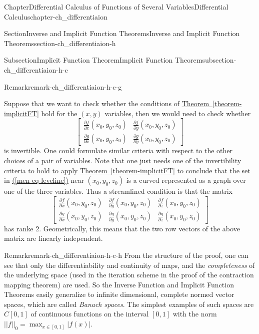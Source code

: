 \documentclass[oneside,10pt,]{book}
\newcommand{\xreffont}{\relax}
\numberwithin{equation}{section}
\newcommand{\amp}{&}
\begin{document}
\begin{chapterptx}{Chapter}{Differential Calculus of Functions of Several Variables}{}{Differential Calculus}{}{}{chapter-ch_differentiaion}
\begin{sectionptx}{Section}{Inverse and Implicit Function Theorems}{}{Inverse and Implicit Function Theorems}{}{}{section-ch_differentiaion-h}
\begin{subsectionptx}{Subsection}{Implicit Function Theorem}{}{Implicit Function Theorem}{}{}{subsection-ch_differentiaion-h-c}
\begin{remark}{Remark}{}{remark-ch_differentiaion-h-c-g}
\par
Suppose that we want to check whether the conditions of \hyperref[theorem-implicitFT]{Theorem~{\xreffont\ref{theorem-implicitFT}}} hold for the \((x, y)\) variables, then we would need to check whether%
\begin{equation*}
\begin{bmatrix} \frac{\partial f}{\partial x}(x_{0}, y_{0},z_{0}) \amp \frac{\partial f}{\partial y}(x_{0}, y_{0},z_{0})\\
\frac{\partial g}{\partial x}(x_{0}, y_{0},z_{0}) \amp \frac{\partial g}{\partial y}(x_{0}, y_{0},z_{0})\end{bmatrix}
\end{equation*}
is invertible.  One could formulate similar criteria with respect to the other choices of a pair of variables. Note that one just needs one of the invertibility criteria to hold to apply \hyperref[theorem-implicitFT]{Theorem~{\xreffont\ref{theorem-implicitFT}}} to conclude that the set in \hyperref[men-eq-leveline]{({\xreffont\ref{men-eq-leveline}})} near \((x_{0}, y_{0},z_{0})\) is a curved  represented as a graph over one of the  three variables. Thus a streamlined condition is that the matrix%
\begin{equation*}
\begin{bmatrix} \frac{\partial f}{\partial x}(x_{0}, y_{0},z_{0}) \amp \frac{\partial f}{\partial y}(x_{0}, y_{0},z_{0})
\amp \frac{\partial f}{\partial z}(x_{0}, y_{0},z_{0}) \\
\frac{\partial g}{\partial x}(x_{0}, y_{0},z_{0}) \amp \frac{\partial g}{\partial y}(x_{0}, y_{0},z_{0})
\amp \frac{\partial g}{\partial z}(x_{0}, y_{0},z_{0}) \end{bmatrix}
\end{equation*}
has ranke \(2\). Geometrically, this means that the two row vectors of the above matrix are linearly independent.%
\end{remark}
\begin{remark}{Remark}{}{remark-ch_differentiaion-h-c-h}%
From the structure of the proof, one can see that only the differentiability and continuity of maps, and the \emph{completeness} of the underlying space (used in the iteration scheme in the proof of the contraction mapping theorem) are used. So the Inverse Function and Implicit Function Theorems easily generalize to  infinite dimensional, complete normed vector spaces, which are called \emph{Banach spaces}. The simplest examples of such spaces are \(C[0,1]\) of continuous functions on the interval \([0,1]\) with the norm \(||f||_0 = \max_{x \in [0,1]} |f(x)|\).%

\end{remark}
\end{subsectionptx}
\end{sectionptx}
\end{chapterptx}
\end{document}
